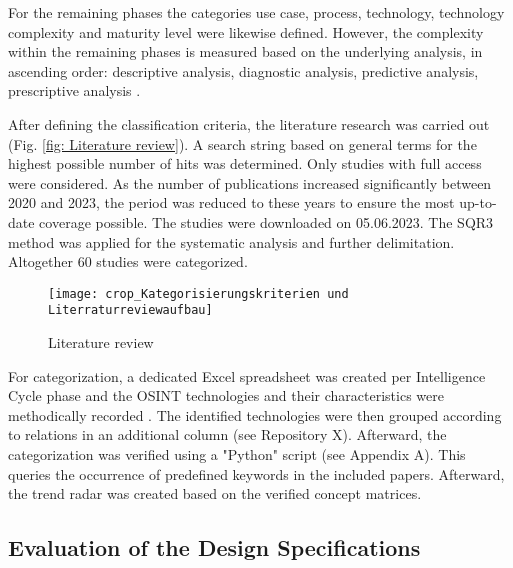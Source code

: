 \documentclass[10pt]{article}
\begin{document}
For the remaining phases the categories use case, process,
technology, technology complexity and maturity level
were likewise defined. However, the complexity within the remaining
phases is measured based on the underlying analysis, in
ascending order: descriptive analysis, diagnostic analysis, predictive
analysis, prescriptive analysis \cite{Delen.2013,GartnerGmbH.2012}.

After defining the classification criteria, the literature research
was carried out (Fig. \ref{fig: Literature review}). A search string based on
general terms for the highest possible number of hits was determined. Only studies
with full access were considered. As the number of publications
increased significantly between 2020 and 2023, the period was reduced
to these years to ensure the most up-to-date coverage possible.
The studies were downloaded on 05.06.2023. The
SQR3 method \cite{Robinson.1970} was applied for the systematic analysis and further
delimitation. Altogether 60 studies were categorized.

\begin{figure}[t]
    \centering
    \texttt{[image: crop\_Kategorisierungskriterien und Literraturreviewaufbau]}
    \caption{Literature review}
    \label{fig:LiteratureReview}
\end{figure}

\vspace{-1.5\baselineskip} %


For categorization, a dedicated Excel spreadsheet was created per
Intelligence Cycle phase and the OSINT technologies and their
characteristics were methodically recorded \cite{Cleven.2009, Webster.2002}. The identified
technologies were then grouped according to relations in an
additional column (see Repository X). Afterward, the categorization was
verified using a "Python" script (see Appendix A). This
queries the occurrence of predefined keywords in the included papers.
Afterward, the trend radar was created based on the verified concept matrices.

\subsection{Evaluation of the Design Specifications}
\end{document}
